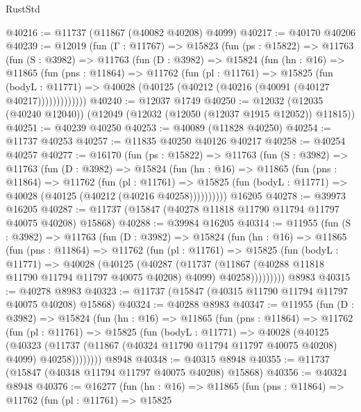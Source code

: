 \begin{lexlean}{RustStd}
\begin{coremodule}
@40216 := @11737 (@11867 (@40082 @40208) @4099)
@40217 := @40170 @40206
@40239 := @12019
    (fun (Γ : @11767) =>
    @15823
      (fun (ps : @15822) =>
      @11763
        (fun (S : @3982) =>
        @11763
          (fun (D : @3982) =>
          @15824
            (fun (hn : @16) =>
            @11865
              (fun (pns : @11864) =>
              @11762
                (fun (pl : @11761) =>
                @15825
                  (fun (bodyL : @11771) =>
                  @40028 (@40125 (@40212 (@40216 (@40091 (@40127 @40217)))))))))))))
@40240 := @12037 @1749
@40250 := @12032 (@12035 (@40240 @12040)) (@12049 (@12032 (@12050 (@12037 @1915 @12052)) @11815))
@40251 := @40239 @40250
@40253 := @40089 (@11828 @40250)
@40254 := @11737 @40253
@40257 := @11835 @40250 @40126 @40217
@40258 := @40254 @40257
@40277 := @16170
    (fun (ps : @15822) =>
    @11763
      (fun (S : @3982) =>
      @11763
        (fun (D : @3982) =>
        @15824
          (fun (hn : @16) =>
          @11865
            (fun (pns : @11864) =>
            @11762
              (fun (pl : @11761) =>
              @15825 (fun (bodyL : @11771) => @40028 (@40125 (@40212 (@40216 @40258))))))))))
    @16205
@40278 := @39973 @16205
@40287 := @11737 (@15847 (@40278 @11818 @11790 @11794 @11797 @40075 @40208) @15868)
@40288 := @39984 @16205
@40314 := @11955
    (fun (S : @3982) =>
    @11763
      (fun (D : @3982) =>
      @15824
        (fun (hn : @16) =>
        @11865
          (fun (pns : @11864) =>
          @11762
            (fun (pl : @11761) =>
            @15825
              (fun (bodyL : @11771) =>
              @40028
                (@40125
                  (@40287
                    (@11737
                      (@11867 (@40288 @11818 @11790 @11794 @11797 @40075 @40208) @4099)
                      @40258)))))))))
    @8983
@40315 := @40278 @8983
@40323 := @11737 (@15847 (@40315 @11790 @11794 @11797 @40075 @40208) @15868)
@40324 := @40288 @8983
@40347 := @11955
    (fun (D : @3982) =>
    @15824
      (fun (hn : @16) =>
      @11865
        (fun (pns : @11864) =>
        @11762
          (fun (pl : @11761) =>
          @15825
            (fun (bodyL : @11771) =>
            @40028
              (@40125
                (@40323
                  (@11737 (@11867 (@40324 @11790 @11794 @11797 @40075 @40208) @4099) @40258))))))))
    @8948
@40348 := @40315 @8948
@40355 := @11737 (@15847 (@40348 @11794 @11797 @40075 @40208) @15868)
@40356 := @40324 @8948
@40376 := @16277
    (fun (hn : @16) =>
    @11865
      (fun (pns : @11864) =>
      @11762
        (fun (pl : @11761) =>
        @15825

\end{coremodule}
\end{lexlean}
